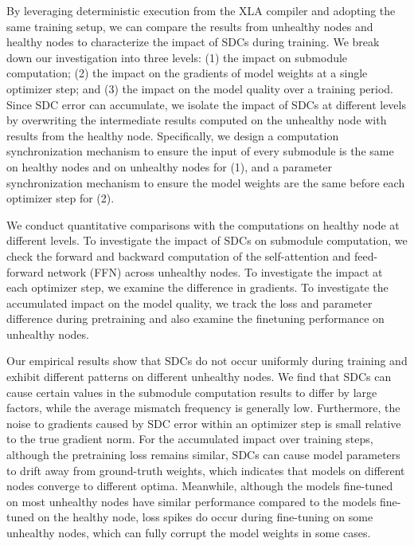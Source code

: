 By leveraging deterministic execution from the XLA compiler and adopting the same training setup, we can compare the results from unhealthy nodes and healthy nodes to characterize the impact of SDCs during training.
We break down our investigation into three levels: (1) the impact on submodule computation; (2) the impact on the gradients of model weights at a single optimizer step; and (3) the impact on the model quality over a training period. Since SDC error can accumulate, we isolate the impact of SDCs at different levels by overwriting the intermediate results computed on the unhealthy node with results from the healthy node. Specifically, we design a computation synchronization mechanism to ensure the input of every submodule is the same on healthy nodes and on unhealthy nodes for (1), and a parameter synchronization mechanism to ensure the model weights are the same before each optimizer step for (2).

We conduct quantitative comparisons with the computations on healthy node at different levels. To investigate the impact of SDCs on submodule computation, we check the forward and backward computation of the self-attention and feed-forward network (FFN) across unhealthy nodes. To investigate the impact at each optimizer step, we examine the difference in gradients. To investigate the accumulated impact on the model quality, we track the loss and parameter difference during pretraining and also examine the finetuning performance on unhealthy nodes. 

Our empirical results show that SDCs do not occur uniformly during training and exhibit different patterns on different unhealthy nodes. We find that SDCs can cause certain values in the submodule computation results to differ by large factors, while the average mismatch frequency is generally low. Furthermore, the noise to gradients caused by SDC error within an optimizer step is small relative to the true gradient norm. For the accumulated impact over training steps, although the pretraining loss remains similar, SDCs can cause model parameters to drift away from ground-truth weights, which indicates that models on different nodes converge to different optima. Meanwhile, although the models fine-tuned on most unhealthy nodes have similar performance compared to the models fine-tuned on the healthy node, loss spikes do occur during fine-tuning on some unhealthy nodes, which can fully corrupt the model weights in some cases.

